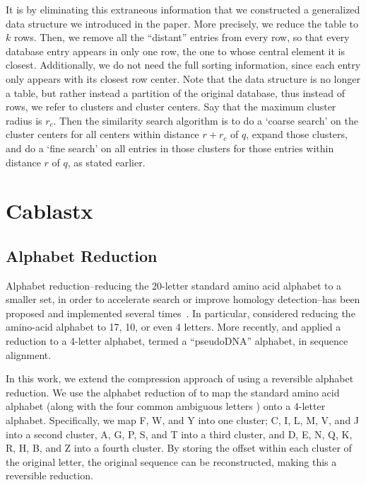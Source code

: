 \documentclass{amsbook}
\theoremstyle{definition}
\theoremstyle{remark}
\numberwithin{equation}{section}
\begin{document}
It is by eliminating this extraneous information that we constructed a generalized data structure we introduced in the paper.
More precisely, we reduce the table to $k$ rows.
Then, we remove all the ``distant'' entries from every row, so that every database entry appears in only one row, the one to whose central element it is closest.
Additionally, we do not need the full sorting information, since each entry only appears with its closest row center.
Note that the data structure is no longer a table, but rather instead a partition of the original database, thus instead of rows, we refer to clusters and cluster centers.
Say that the maximum cluster radius is $r_c$.
Then the similarity search algorithm is to do a `coarse search' on the cluster centers for all centers within distance $r+r_c$ of $q$, expand those clusters, and do a ‘fine search’ on all entries in those clusters for those entries within distance $r$ of $q$, as stated earlier.

\section{Cablastx}

\subsection*{Alphabet Reduction}

Alphabet reduction--reducing the 20-letter standard amino acid alphabet to a
smaller set, in order to accelerate search or improve homology detection--has
been proposed and implemented several times~\cite{blah}.
In particular, \citet{Murphy:2000, Peterson:2009} considered reducing the
amino-acid alphabet to 17, 10, or even 4 letters.
More recently, \citet{Zhao:2012} and \citet{Huson:2013} applied a reduction to
a 4-letter alphabet, termed a ``pseudoDNA'' alphabet, in sequence alignment.

In this work, we extend the compression approach of \citet{Daniels:2013} using
a reversible alphabet reduction.
We use the alphabet reduction of \citet{Murphy:2000} to map the standard amino
acid alphabet (along with the four common ambiguous letters ) onto a 4-letter 
alphabet.
Specifically, we map F, W, and Y into one cluster; C, I, L, M, V, and J into
a second cluster, A, G, P, S, and T into a third cluster, and
D, E, N, Q, K, R, H, B, and Z into a fourth cluster.
By storing the offset within each cluster of the original letter, the original
sequence can be reconstructed, making this a reversible reduction.
\end{document}
